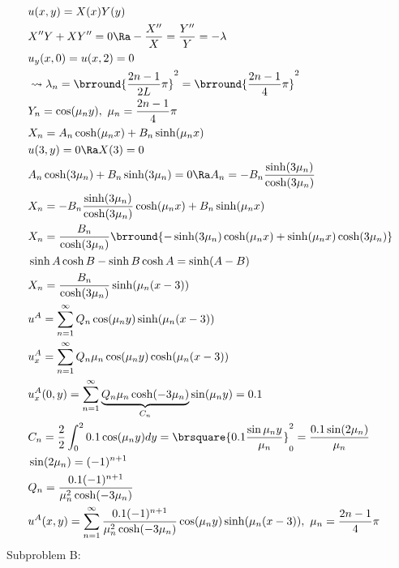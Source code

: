 \begin{align*}
    &u(x,y)=X(x)Y(y)\\
    &X''Y+XY''=0\Ra -\frac{X''}{X}=\frac{Y''}{Y}=-\lambda\\
    &u_y(x,0)=u(x,2)=0\\
    &\leadsto \lambda_n=\brround{\frac{2n-1}{2L}\pi}^2=\brround{\frac{2n-1}{4}\pi}^2\\
    &Y_n=\cos(\mu_n y),\ \mu_n=\frac{2n-1}{4}\pi\\
    &X_n=A_n\cosh(\mu_nx)+B_n\sinh(\mu_nx)\\
    &u(3,y)=0\Ra X(3)=0\\
    &A_n\cosh(3\mu_n)+B_n\sinh(3\mu_n)=0\Ra A_n=-B_n\frac{\sinh(3\mu_n)}{\cosh(3\mu_n)}\\
    &X_n=-B_n\frac{\sinh(3\mu_n)}{\cosh(3\mu_n)}\cosh(\mu_nx)+B_n\sinh(\mu_nx)\\
    &X_n=\frac{B_n}{\cosh(3\mu_n)}\brround{-\sinh(3\mu_n)\cosh(\mu_nx)+\sinh(\mu_nx)\cosh(3\mu_n)}\\
    &\sinh A\cosh B-\sinh B\cosh A=\sinh(A-B)\\
    &X_n=\frac{B_n}{\cosh(3\mu_n)}\sinh(\mu_n(x-3))\\
    &u^A=\sum_{n=1}^\infty Q_n\cos(\mu_n y)\sinh(\mu_n(x-3))\\
    &u_x^A=\sum_{n=1}^\infty Q_n\mu_n\cos(\mu_ny)\cosh(\mu_n(x-3))\\
    &u_x^A(0,y)=\sum_{n=1}^\infty \underbrace{Q_n\mu_n\cosh(-3\mu_n)}_{C_n}\sin(\mu_ny)=0.1\\
    &C_n=\frac{2}{2}\int_0^20.1\cos(\mu_ny)dy=\brsquare{0.1\frac{\sin{\mu_n y}}{\mu_n}}_0^2=\frac{0.1\sin(2\mu_n)}{\mu_n}\\
    &\sin(2\mu_n)=(-1)^{n+1}\\
    &Q_n=\frac{0.1(-1)^{n+1}}{\mu_n^2\cosh(-3\mu_n)}\\
    &u^A(x,y)=\sum_{n=1}^\infty\frac{0.1(-1)^{n+1}}{\mu_n^2\cosh(-3\mu_n)}\cos(\mu_ny)\sinh(\mu_n(x-3)),\ \mu_n=\frac{2n-1}{4}\pi
\end{align*}
Subproblem B:
